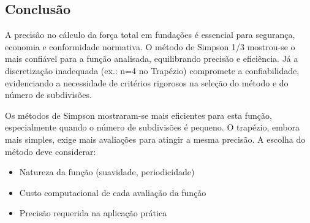 \documentclass{article}
\begin{document}
\subsection*{Conclusão}
A precisão no cálculo da força total em fundações é essencial para segurança, economia e conformidade normativa. O método de Simpson 1/3 mostrou-se o mais confiável para a função analisada, equilibrando precisão e eficiência. Já a discretização inadequada (ex.: 
n=4 no Trapézio) compromete a confiabilidade, evidenciando a necessidade de critérios rigorosos na seleção do método e do número de subdivisões.

Os métodos de Simpson mostraram-se mais eficientes para esta função, especialmente quando o número de subdivisões é pequeno. O trapézio, embora mais simples, exige mais avaliações para atingir a mesma precisão. A escolha do método deve considerar:
\begin{itemize}
\item Natureza da função (suavidade, periodicidade)
\item Custo computacional de cada avaliação da função
\item Precisão requerida na aplicação prática
\end{itemize}
\end{document}

